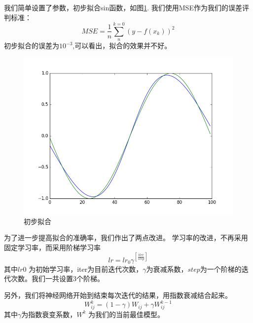 \documentclass{article}
\begin{document}
\begin{CJK}{UTF8}{gkai}
我们简单设置了参数，初步拟合sin函数，如图\ref{fig:fig1}.
我们使用MSE作为我们的误差评判标准：
\begin{equation}
	MSE = \frac{1}{n}\sum_{n}^{k=0}(y-f(x_k))^2
\end{equation}
初步拟合的误差为$10^{-3}$,可以看出，拟合的效果并不好。

\begin{figure}
\centering
\includegraphics[width=\linewidth]{../fig1}
\caption{初步拟合}
\label{fig:fig1}
\end{figure}

为了进一步提高拟合的准确率，我们作出了两点改进。
学习率的改进，不再采用固定学习率，而采用阶梯学习率
\begin{equation}
	lr = lr_0  \gamma^{[\frac{iter}{step}]}
\end{equation}
其中$lr0$ 为初始学习率，iter为目前迭代次数，$\gamma$为衰减系数，$step$为一个阶梯的迭代次数。我们一共设置3个阶梯。

另外，我们将神经网络开始到结束每次迭代的结果，用指数衰减结合起来\cite{karpathy2016cs231n}。
\begin{equation}
W^k_{ij} = (1-\gamma) W_{ij}  + \gamma W^{k-1}_{ij}
\end{equation}
其中$\gamma$为指数衰变系数，$W^k$ 为我们的当前最佳模型。


\end{CJK}
\end{document}

